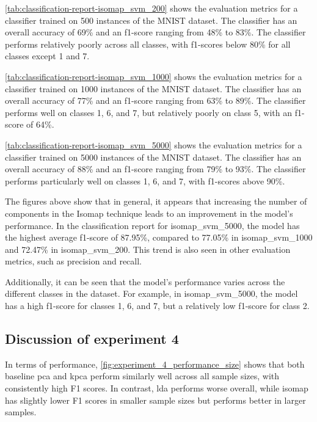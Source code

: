 

\autoref{tab:classification-report-isomap_svm_200} shows the evaluation metrics for a classifier trained on 500 instances of the MNIST dataset. The classifier has an overall accuracy of 69\% and an f1-score ranging from 48\% to 83\%. The classifier performs relatively poorly across all classes, with f1-scores below 80\% for all classes except 1 and 7.



\autoref{tab:classification-report-isomap_svm_1000} shows the evaluation metrics for a classifier trained on 1000 instances of the MNIST dataset. The classifier has an overall accuracy of 77\% and an f1-score ranging from 63\% to 89\%. The classifier performs well on classes 1, 6, and 7, but relatively poorly on class 5, with an f1-score of 64\%.





\autoref{tab:classification-report-isomap_svm_5000} shows the evaluation metrics for a classifier trained on 5000 instances of the MNIST dataset. The classifier has an overall accuracy of 88\% and an f1-score ranging from 79\% to 93\%. The classifier performs particularly well on classes 1, 6, and 7, with f1-scores above 90\%.


The figures above show that in general, it appears that increasing the number of components in the Isomap technique leads to an improvement in the model's performance. In the classification report for isomap\_svm\_5000, the model has the highest average f1-score of 87.95\%, compared to 77.05\% in isomap\_svm\_1000 and 72.47\% in isomap\_svm\_200. This trend is also seen in other evaluation metrics, such as precision and recall.

Additionally, it can be  seen that the model's performance varies across the different classes in the dataset. For example, in isomap\_svm\_5000, the model has a high f1-score for classes 1, 6, and 7, but a relatively low f1-score for class 2.


\subsection{Discussion of experiment 4}
In terms of performance, \autoref{fig:experiment_4_performance_size} shows that both baseline \gls{pca} and \gls{kpca} perform similarly well across all sample sizes, with consistently high F1 scores. In contrast, \gls{lda} performs worse overall, while \gls{isomap} has slightly lower F1 scores in smaller sample sizes but performs better in larger samples.


